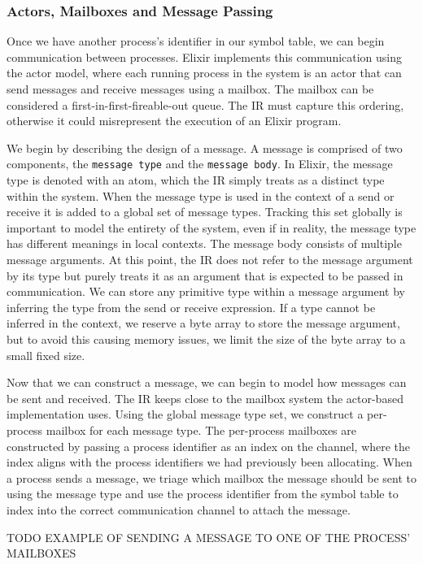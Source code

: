 \subsubsection{Actors, Mailboxes and Message Passing}
Once we have another process's identifier in our symbol table, we can begin communication between processes. Elixir implements this communication using the actor model, where each running process in the system is an actor that can send messages and receive messages using a mailbox. The mailbox can be considered a first-in-first-fireable-out queue. The IR must capture this ordering, otherwise it could misrepresent the execution of an Elixir program.
\par
We begin by describing the design of a message. A message is comprised of two components, the \texttt{message type} and the \texttt{message body}. In Elixir, the message type is denoted with an atom, which the IR simply treats as a distinct type within the system. When the message type is used in the context of a send or receive it is added to a global set of message types. Tracking this set globally is important to model the entirety of the system, even if in reality, the message type has different meanings in local contexts. The message body consists of multiple message arguments. At this point, the IR does not refer to the message argument by its type but purely treats it as an argument that is expected to be passed in communication. We can store any primitive type within a message argument by inferring the type from the send or receive expression. If a type cannot be inferred in the context, we reserve a byte array to store the message argument, but to avoid this causing memory issues, we limit the size of the byte array to a small fixed size.
\par
Now that we can construct a message, we can begin to model how messages can be sent and received. The IR keeps close to the mailbox system the actor-based implementation uses. Using the global message type set, we construct a per-process mailbox for each message type. The per-process mailboxes are constructed by passing a process identifier as an index on the channel, where the index aligns with the process identifiers we had previously been allocating. When a process sends a message, we triage which mailbox the message should be sent to using the message type and use the process identifier from the symbol table to index into the correct communication channel to attach the message.
\par
TODO EXAMPLE OF SENDING A MESSAGE TO ONE OF THE PROCESS' MAILBOXES
